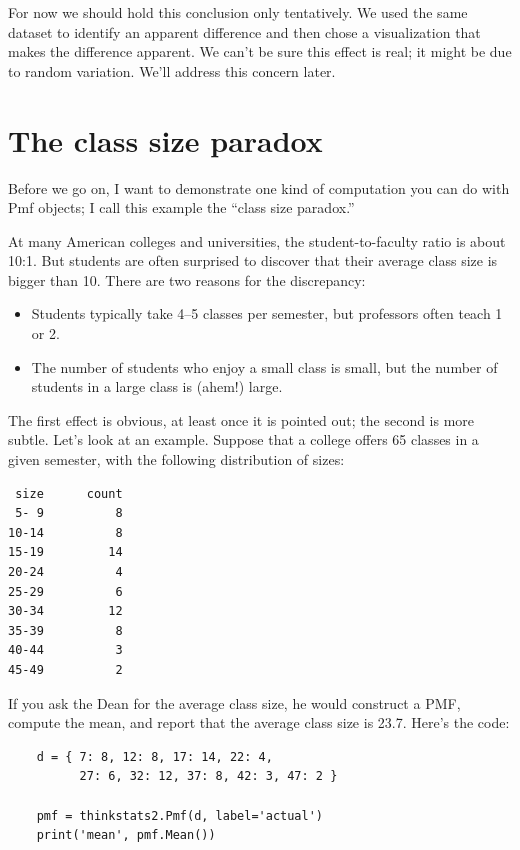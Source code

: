 \documentclass[12pt]{book}
\begin{document}
For now we should hold this conclusion only tentatively.
We used the same dataset to identify an
apparent difference and then chose a visualization that makes the
difference apparent.  We can't be sure this effect is real;
it might be due to random variation.  We'll address this concern
later.


\section{The class size paradox}

Before we go on, I want to demonstrate
one kind of computation you can do with Pmf objects; I call
this example the ``class size paradox.''

At many American colleges and universities, the student-to-faculty
ratio is about 10:1.  But students are often surprised to discover
that their average class size is bigger than 10.  There
are two reasons for the discrepancy:

\begin{itemize}

\item Students typically take 4--5 classes per semester, but
professors often teach 1 or 2.

\item The number of students who enjoy a small class is small,
but the number of students in a large class is (ahem!) large.

\end{itemize}

The first effect is obvious, at least once it is pointed out;
the second is more subtle.  Let's look at an example.  Suppose
that a college offers 65 classes in a given semester, with the
following distribution of sizes:
%
\begin{verbatim}
 size      count
 5- 9          8
10-14          8
15-19         14
20-24          4
25-29          6
30-34         12
35-39          8
40-44          3
45-49          2
\end{verbatim}

If you ask the Dean for the average class size, he would
construct a PMF, compute the mean, and report that the
average class size is 23.7.  Here's the code:

\begin{verbatim}
    d = { 7: 8, 12: 8, 17: 14, 22: 4, 
          27: 6, 32: 12, 37: 8, 42: 3, 47: 2 }

    pmf = thinkstats2.Pmf(d, label='actual')
    print('mean', pmf.Mean())
\end{verbatim}
\end{document}
